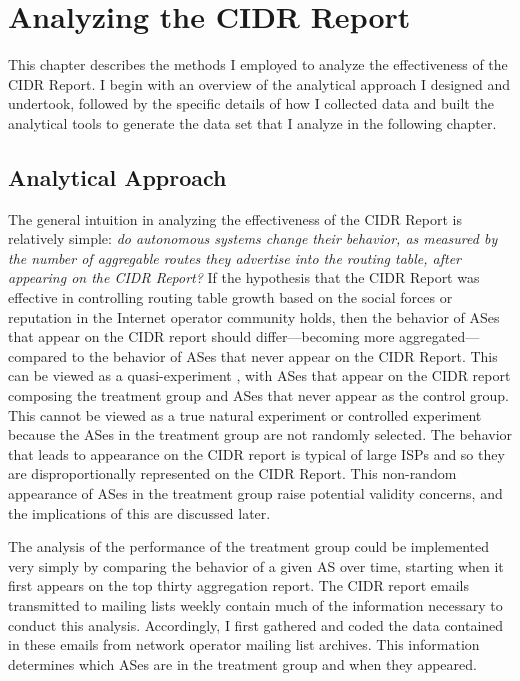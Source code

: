 \chapter{Analyzing the CIDR Report}

This chapter describes the methods I employed to analyze the effectiveness of the CIDR Report. I begin with an overview of the analytical approach I designed and undertook, followed by the specific details of how I collected data and built the analytical tools to generate the data set that I analyze in the following chapter.

\section{Analytical Approach}


The general intuition in analyzing the effectiveness of the CIDR Report is relatively simple: \emph{do autonomous systems change their behavior, as measured by the number of aggregable routes they advertise into the routing table, after appearing on the CIDR Report?} If the hypothesis that the CIDR Report was effective in controlling routing table growth based on the social forces or reputation in the Internet operator community holds, then the behavior of ASes that appear on the CIDR report should differ---becoming more aggregated---compared to the behavior of ASes that never appear on the CIDR Report. This can be viewed as a quasi-experiment \cite{babbie?}, with ASes that appear on the CIDR report composing the treatment group and ASes that never appear as the control group. This cannot be viewed as a true natural experiment or controlled experiment because the ASes in the treatment group are not randomly selected. The behavior that leads to appearance on the CIDR report is typical of large ISPs and so they are disproportionally represented on the CIDR Report. This non-random appearance of ASes in the treatment group raise potential validity concerns, and the implications of this are discussed later.

The analysis of the performance of the treatment group could be implemented very simply by comparing the behavior of a given AS over time, starting when it first appears on the top thirty aggregation report. The CIDR report emails transmitted to mailing lists weekly contain much of the information necessary to conduct this analysis. Accordingly, I first gathered and coded the data contained in these emails from network operator mailing list archives. This information determines which ASes are in the treatment group and when they appeared.

